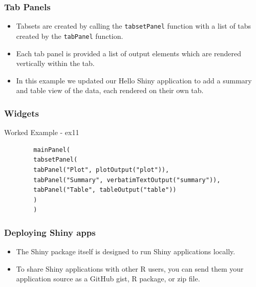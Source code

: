 \documentclass{beamer}
\begin{document}
\begin{frame}
	\frametitle{Tab Panels}
	\begin{itemize}
	\item Tabsets are created by calling the \texttt{tabsetPanel} function with a list of tabs created by the \texttt{tabPanel} function. 
	\item Each tab panel is provided a list of output elements which are rendered vertically within the tab.
	
	\item In this example we updated our Hello Shiny application to add a summary and table view of the data, each rendered on their own tab. 
\end{itemize}
\end{frame}
\begin{frame}[fragile]
	\frametitle{Widgets}
Worked Example  - 	ex11
	\begin{framed}
		\begin{verbatim}
		mainPanel(
		tabsetPanel(
		tabPanel("Plot", plotOutput("plot")), 
		tabPanel("Summary", verbatimTextOutput("summary")), 
		tabPanel("Table", tableOutput("table"))
		)
		)
		\end{verbatim}
	\end{framed}
\end{frame}


\begin{frame}
	\frametitle{Deploying Shiny apps}
	\Large
	\vspace{-1cm}
	\begin{itemize}
		\item  The Shiny package itself is designed to run Shiny applications locally. 
		\item To share Shiny applications with other R users, you can send them your application source as a GitHub gist, R package, or zip file.
	\end{itemize}
\end{frame}
\end{document}
